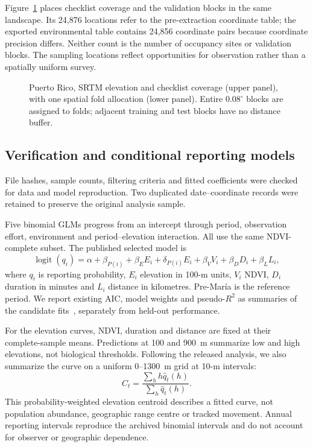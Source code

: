 Figure~\ref{fig:area} places checklist coverage and the validation blocks in the same landscape. Its 24,876 locations refer to the pre-extraction coordinate table; the exported environmental table contains 24,856 coordinate pairs because coordinate precision differs. Neither count is the number of occupancy sites or validation blocks. The sampling locations reflect opportunities for observation rather than a spatially uniform survey.
\begin{figure}[htbp]\centering
{}
\caption{Puerto Rico, SRTM elevation and checklist coverage (upper panel), with one spatial fold allocation (lower panel). Entire $0.08^\circ$ blocks are assigned to folds; adjacent training and test blocks have no distance buffer.}\label{fig:area}
\end{figure}

\subsection{Verification and conditional reporting models}
\label{sec:verify}
File hashes, sample counts, filtering criteria and fitted coefficients were checked for data and model reproduction. Two duplicated date--coordinate records were retained to preserve the original analysis sample.


Five binomial GLMs progress from an intercept through period, observation effort, environment and period--elevation interaction. All use the same NDVI-complete subset. The published selected model is
\begin{equation}
\operatorname{logit}(q_i)=\alpha+\beta_{P(i)}+\beta_E E_i+\delta_{P(i)}E_i+\beta_V V_i+\beta_D D_i+\beta_L L_i,
\label{eq:glm}
\end{equation}
where $q_i$ is reporting probability, $E_i$ elevation in 100-m units, $V_i$ NDVI, $D_i$ duration in minutes and $L_i$ distance in kilometres. Pre-Mar\'ia is the reference period. We report existing AIC, model weights and pseudo-$R^2$ as summaries of the candidate fits~\cite{burnham2002,mcfadden1974}, separately from held-out performance.

For the elevation curves, NDVI, duration and distance are fixed at their complete-sample means. Predictions at 100 and 900~m summarize low and high elevations, not biological thresholds. Following the released analysis, we also summarize the curve on a uniform 0--1300~m grid at 10-m intervals:
\begin{equation}
C_t=\frac{\sum_h h\widehat q_t(h)}{\sum_h\widehat q_t(h)}.
\end{equation}
This probability-weighted elevation centroid describes a fitted curve, not population abundance, geographic range centre or tracked movement. Annual reporting intervals reproduce the archived binomial intervals and do not account for observer or geographic dependence.


